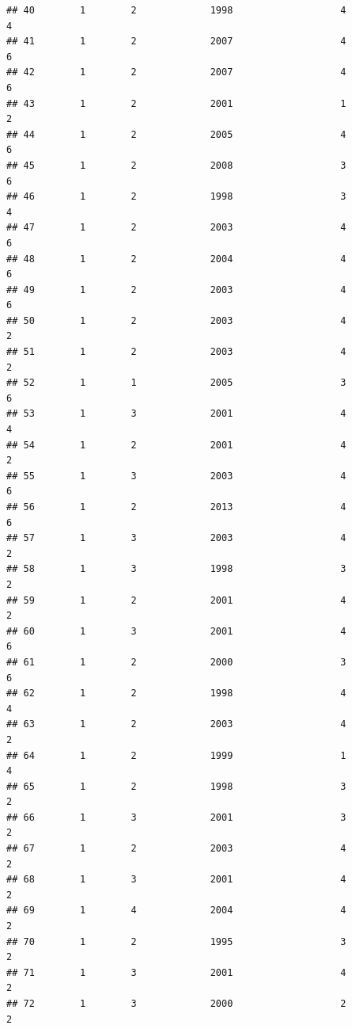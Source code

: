 \documentclass[
]{article}
\begin{document}
\begin{verbatim}
## 40        1        2             1998                   4                 4
## 41        1        2             2007                   4                 6
## 42        1        2             2007                   4                 6
## 43        1        2             2001                   1                 2
## 44        1        2             2005                   4                 6
## 45        1        2             2008                   3                 6
## 46        1        2             1998                   3                 4
## 47        1        2             2003                   4                 6
## 48        1        2             2004                   4                 6
## 49        1        2             2003                   4                 6
## 50        1        2             2003                   4                 2
## 51        1        2             2003                   4                 2
## 52        1        1             2005                   3                 6
## 53        1        3             2001                   4                 4
## 54        1        2             2001                   4                 2
## 55        1        3             2003                   4                 6
## 56        1        2             2013                   4                 6
## 57        1        3             2003                   4                 2
## 58        1        3             1998                   3                 2
## 59        1        2             2001                   4                 2
## 60        1        3             2001                   4                 6
## 61        1        2             2000                   3                 6
## 62        1        2             1998                   4                 4
## 63        1        2             2003                   4                 2
## 64        1        2             1999                   1                 4
## 65        1        2             1998                   3                 2
## 66        1        3             2001                   3                 2
## 67        1        2             2003                   4                 2
## 68        1        3             2001                   4                 2
## 69        1        4             2004                   4                 2
## 70        1        2             1995                   3                 2
## 71        1        3             2001                   4                 2
## 72        1        3             2000                   2                 2

\end{verbatim}
\end{document}

